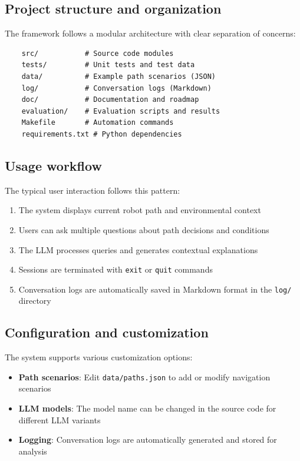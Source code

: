 \subsection{Project structure and organization}

The framework follows a modular architecture with clear separation of concerns:

\begin{verbatim}
    src/           # Source code modules
    tests/         # Unit tests and test data
    data/          # Example path scenarios (JSON)
    log/           # Conversation logs (Markdown)
    doc/           # Documentation and roadmap
    evaluation/    # Evaluation scripts and results
    Makefile       # Automation commands
    requirements.txt # Python dependencies
\end{verbatim}

\subsection{Usage workflow}

The typical user interaction follows this pattern:
\begin{enumerate}
    \item The system displays current robot path and environmental context
    \item Users can ask multiple questions about path decisions and conditions
    \item The LLM processes queries and generates contextual explanations
    \item Sessions are terminated with \texttt{exit} or \texttt{quit} commands
    \item Conversation logs are automatically saved in Markdown format in the \texttt{log/} directory
\end{enumerate}

\subsection{Configuration and customization}

The system supports various customization options:

\begin{itemize}
    \item \textbf{Path scenarios}: Edit \texttt{data/paths.json} to add or modify navigation scenarios
    \item \textbf{LLM models}: The model name can be changed in the source code for different LLM variants
    \item \textbf{Logging}: Conversation logs are automatically generated and stored for analysis
\end{itemize}

